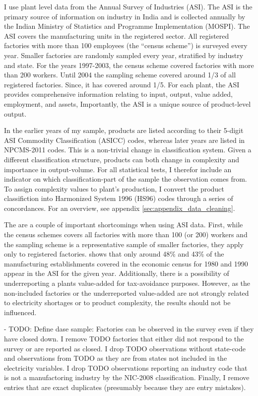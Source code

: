 \documentclass[11pt]{article}
\begin{document}
I use plant level data from the Annual Survey of Industries (ASI). The ASI is the primary source of information on industry in India and is collected annually by the Indian Ministry of Statistics and Programme Implementation (MOSPI). The ASI covers the manufacturing units in the registered sector. All registered factories with more than 100 employees (the ``census scheme'') is surveyed every year. Smaller factories are randomly sampled every year, stratified by industry and state. For the years 1997-2003, the census scheme covered factories with more than 200 workers. Until 2004 the sampling scheme covered around 1/3 of all registered factories. Since, it has covered around 1/5. For each plant, the ASI provides comprehensive information relating to input, output, value added, employment, and assets, Importantly, the ASI is a unique source of product-level output. 

In the earlier years of my sample, products are listed according to their 5-digit ASI Commodity Classification (ASICC) codes, whereas later years are listed in NPCMS-2011 codes. This is a non-trivial change in classification system. Given a different classification structure, products can both change in complexity and importance in output-volume. For all statistical tests, I therefor include an indicator on which classification-part of the sample the observation comes from. To assign complexity values to plant's production, I convert the product classifiction into Harmonized System 1996 (HS96) codes through a series of concordances. For an overview, see appendix \ref{sec:appendix_data_cleaning}.

The are a couple of important shortcomings when using ASI data. First, while the census schemes covers all factories with more than 100 (or 200) workers and the sampling scheme is a representative sample of smaller factories, they apply only to registered factories. \cite{nagaraj_how_2002} shows that only around 48\% and 43\% of the manufacturing establishments covered in the economic census for 1980 and 1990 appear in the ASI for the given year. Additionally, there is a possibility of underreporting a plants value-added for tax-avoidance purposes. However, as the non-included factories or the underreported value-added are not strongly related to electricity shortages or to product complexity, the results should not be influenced. 

- TODO: Define dase sample: Factories can be observed in the survey even if they have closed down. I remove TODO factories that either did not respond to the survey or are reported as closed. I drop TODO observations without state-code and observations from TODO as they are from states not included in the electricity variables. I drop TODO observations reporting an industry code that is not a manufactoring industry by the NIC-2008 classification. Finally, I remove entries that are exact duplicates (presumably because they are entry mistakes). 
\end{document}
